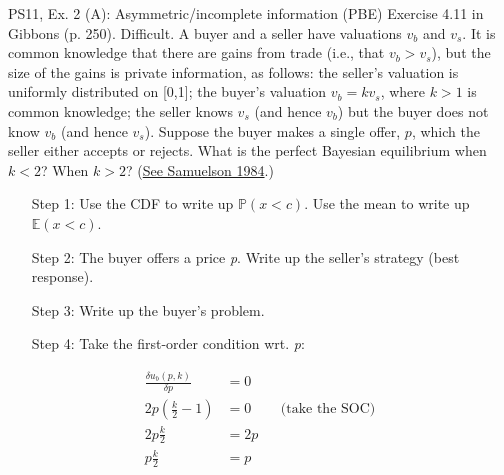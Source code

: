 \begin{frame}{PS11, Ex. 2 (A): Asymmetric/incomplete information (PBE)}
    Exercise 4.11 in Gibbons (p. 250). Difficult. A buyer and a seller have valuations $v_b$ and $v_s$. It is common knowledge that there are gains from trade (i.e., that $v_b > v_s$), but the size of the gains is private information, as follows: the seller’s valuation is uniformly distributed on [0,1]; the buyer’s valuation $v_b = kv_s$, where $k > 1$ is common knowledge; the seller knows $v_s$ (and hence $v_b$) but the buyer does not know $v_b$ (and hence $v_s$). Suppose the buyer makes a single offer, $p$, which the seller either accepts or rejects. What is the perfect Bayesian equilibrium when $k < 2$? When $k > 2$? (\href{https://www.jstor.org/stable/1911195}{See Samuelson 1984}.) \vspace{-8pt}
    \begin{multicols}{2}
      \begin{itemize}
        \item[Step 1:] Use the CDF to write up $\mathbb{P}(x<c)$. Use the mean to write up $\mathbb{E}(x<c)$.
        \item[Step 2:] The buyer offers a price \textit{p}. Write up the seller's strategy (best response).
        \item[Step 3:] Write up the buyer's problem.
        \item[Step 4:] Take the first-order condition wrt. \textit{p}:
      \end{itemize} \vspace{-8pt}
      \begin{align*}
        \frac{\delta u_b(p,k)}{\delta p}&=0\\
        2p\left(\frac{k}{2}-1\right)&=0&&\text{(take the SOC)}\\
        2p\frac{k}{2}&=2p\\
        p\frac{k}{2}&=p
      \end{align*}
      \vfill\null\columnbreak
\end{multicols}
\end{frame}
